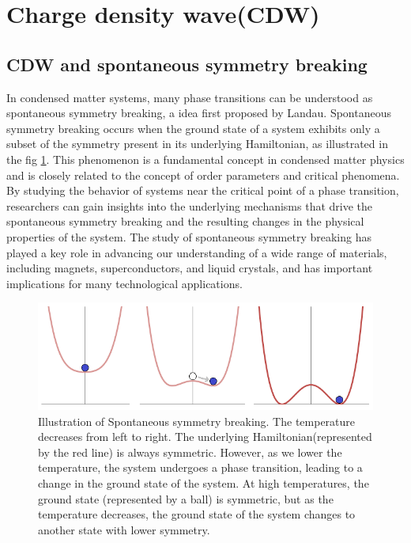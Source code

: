 \section{Charge density wave(CDW)}
\subsection{CDW and spontaneous symmetry breaking}
In condensed matter systems, many phase transitions can be understood as spontaneous symmetry breaking, a idea first proposed by Landau. Spontaneous symmetry breaking occurs when the ground state of a system exhibits only a subset of the symmetry present in its underlying Hamiltonian, as illustrated in the fig \ref{fig:symmetry_breaking}. This phenomenon is a fundamental concept in condensed matter physics and is closely related to the concept of order parameters and critical phenomena. By studying the behavior of systems near the critical point of a phase transition, researchers can gain insights into the underlying mechanisms that drive the spontaneous symmetry breaking and the resulting changes in the physical properties of the system. The study of spontaneous symmetry breaking has played a key role in advancing our understanding of a wide range of materials, including magnets, superconductors, and liquid crystals, and has important implications for many technological applications.

\begin{figure}[h]
    \centering
    \includegraphics[width =\textwidth]{images/Spontaneous_symmetry_breaking_(explanatory_diagram).png}
    \caption{Illustration of Spontaneous symmetry breaking. The temperature decreases from left to right. The underlying Hamiltonian(represented by the red line) is always symmetric. However, as we lower the temperature, the system undergoes a phase transition, leading to a change in the ground state of the system. At high temperatures, the ground state (represented by a ball) is symmetric, but as the temperature decreases, the ground state of the system changes to another state with lower symmetry.  }
    \label{fig:symmetry_breaking}
\end{figure}

